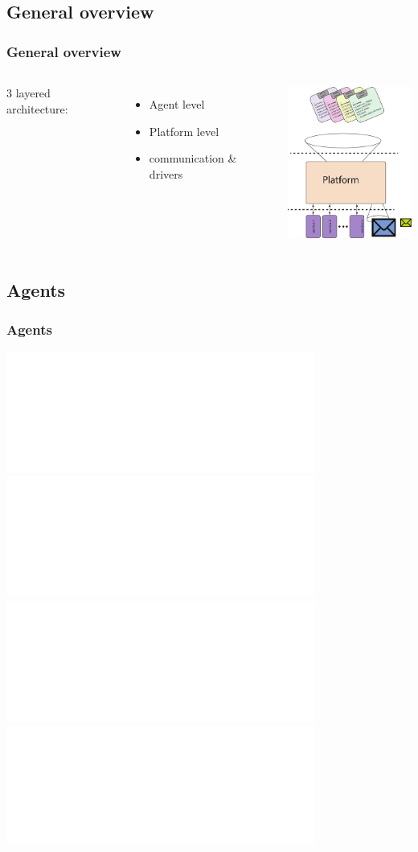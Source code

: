 \documentclass{beamer}
\theoremstyle{definition} \newtheorem{mdefinition}{Definition}
\theoremstyle{plain} \newtheorem{mtheorem}{Theorem}
\theoremstyle{plain} \newtheorem{mcorollary}{Corollary}
\theoremstyle{plain} \newtheorem{mfact}{Fact}
\begin{document}
\subsection{General overview}
\begin{frame}
	\frametitle{General overview}
\begin{columns}[c]
\column{1.5in}
	3 layered architecture:
		\begin{itemize}
		\item Agent level
		\item Platform level
		\item communication \& drivers
		\end{itemize}
\column{2in}
\includegraphics[height=2in]{img/overview_2-eps-converted-to.pdf}

\end{columns}
\end{frame}

\subsection{Agents}

\begin{frame}
	\frametitle{Agents}
\includegraphics<1>[width=4in]{img/agent-1-eps-converted-to.pdf}
\includegraphics<2>[width=4in]{img/agent-2-eps-converted-to.pdf}
\includegraphics<3>[width=4in]{img/agent-3-eps-converted-to.pdf}
\includegraphics<4>[width=4in]{img/agent-4-eps-converted-to.pdf}	

\end{frame}
\end{document}
